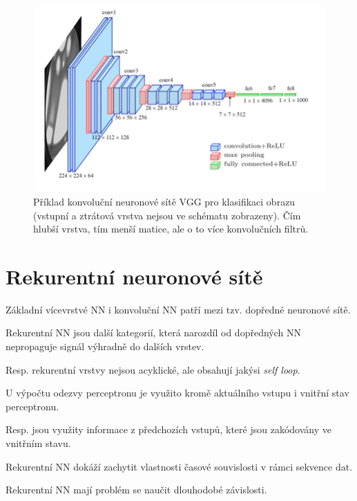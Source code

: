 \begin{figure}[H]
    \centering
    \includegraphics[width=1\linewidth]{vgg.png}
    \caption{Příklad konvoluční neuronové sítě VGG pro klasifikaci obrazu (vstupní a ztrátová vrstva nejsou ve schématu zobrazeny). Čím hlubší vrstva, tím menší matice, ale o to více konvolučních filtrů.}
\end{figure}


\section{Rekurentní neuronové sítě}

\begin{compactitem}
    \item Základní vícevrstvé NN i konvoluční NN patří mezi tzv. dopředné neuronové sítě.

    \item Rekurentní NN jsou další kategorií, která narozdíl od dopředných NN nepropaguje signál výhradně do dalších vrstev. \begin{compactitem}
        \item Resp. rekurentní vrstvy nejsou acyklické, ale obsahují jakýsi \textit{self loop}.
    \end{compactitem}


    \item U výpočtu odezvy perceptronu je využito kromě aktuálního vstupu i vnitřní stav perceptronu. \begin{compactitem}
        \item
        Resp. jsou využity informace z předchozích vstupů, které jsou zakódovány ve vnitřním stavu.
    \end{compactitem}

    \item Rekurentní NN dokáží zachytit vlastnosti časové souvislosti v rámci sekvence dat.

    \item Rekurentní NN mají problém se naučit dlouhodobé závislosti.
\end{compactitem}

